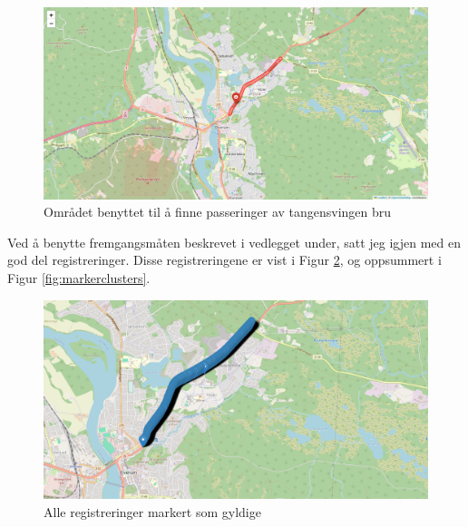 \documentclass{article}
\begin{document}
\begin{figure}[H]
    \centering
    \includegraphics[width=1\textwidth]{./figures/tangensvingen_bru_tangensvingen_vest.png}
    \caption{Området benyttet til å finne passeringer av tangensvingen bru}
    \label{fig:tangensvingen_bru_tangensvingen_vest}
\end{figure}

Ved å benytte fremgangsmåten beskrevet i vedlegget under, satt jeg igjen med en god del registreringer.
Disse registreringene er vist i Figur \ref{fig:tangensvingen_all_markers}, og oppsummert i Figur \ref{fig:markerclusters}.

\begin{figure}[H]
    \centering
    \includegraphics[width=1\textwidth]{./figures/tangensvingen_all_markers.png}
    \caption{Alle registreringer markert som gyldige}
    \label{fig:tangensvingen_all_markers}
\end{figure}
\end{document}

